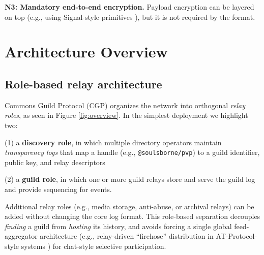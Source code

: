 \documentclass[conference]{IEEEtran}
\newcommand{\cgp}{Commons Guild Protocol (CGP)\xspace}
\begin{document}
\textbf{N3: Mandatory end-to-end encryption.} Payload encryption can be layered on top (e.g., using Signal-style primitives \cite{doubleRatchet}), but it is not required by the format.

\section{Architecture Overview}
\subsection{Role-based relay architecture}
\cgp organizes the network into orthogonal \emph{relay roles}, as seen in Figure \ref{fig:overview}. In the simplest deployment we highlight two:

\vspace{0.2cm}

(1) a \textbf{discovery role}, in which multiple directory operators maintain \emph{transparency logs} that map a handle (e.g., \texttt{@soulsborne/pvp}) to a guild identifier, public key, and relay descriptors

\vspace{0.2cm}

(2) a \textbf{guild role}, in which one or more guild relays store and serve the guild log and provide sequencing for events.

\vspace{0.2cm}

Additional relay roles (e.g., media storage, anti-abuse, or archival relays) can be added without changing the core log format. This role-based separation decouples \emph{finding} a guild from \emph{hosting} its history, and avoids forcing a single global feed-aggregator architecture (e.g., relay-driven ``firehose'' distribution in AT-Protocol-style systems \cite{kleppmann2024atproto}) for chat-style selective participation.
\end{document}
